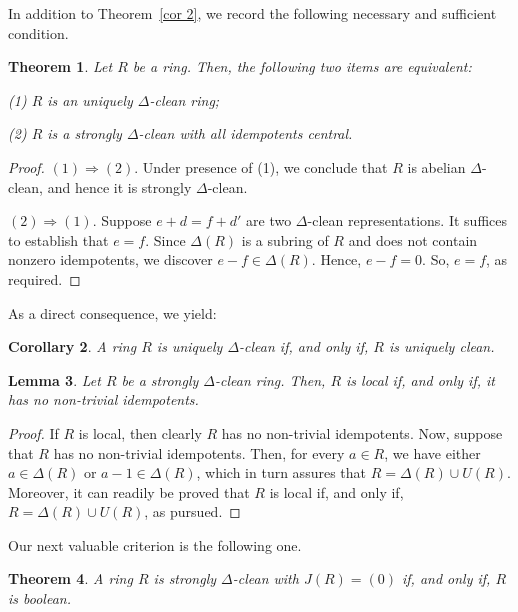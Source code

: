 \documentclass[12pt]{amsart}
\newtheorem{theorem}{Theorem}[section]
\newtheorem{lemma}[theorem]{Lemma}
\newtheorem{corollary}[theorem]{Corollary}
\theoremstyle{definition}
\begin{document}
In addition to Theorem~\ref{cor 2}, we record the following necessary and sufficient condition.

\begin{theorem}\label{cor 3}
Let $R$ be a ring. Then, the following two items are equivalent:
	
(1) $R$ is an uniquely $\Delta$-clean ring;
	
(2) $R$ is a strongly $\Delta$-clean with all idempotents central.
\end{theorem}

\begin{proof}
$(1)\Rightarrow(2)$. Under presence of (1), we conclude that $R$ is abelian $\Delta$-clean, and hence it is strongly $\Delta$-clean.
	
$(2)\Rightarrow (1)$. Suppose $e+d=f+d'$ are two $\Delta$-clean representations. It suffices to establish that $e=f$. Since $\Delta(R)$ is a subring of $R$ and does not contain nonzero idempotents, we discover $e-f\in \Delta(R)$. Hence, $e-f=0$. So, $e=f$, as required.
\end{proof}

As a direct consequence, we yield:

\begin{corollary}
A ring $R$ is uniquely $\Delta$-clean if, and only if, $R$ is uniquely clean.
\end{corollary}

\begin{lemma} \label{ni idempotent}
Let $R$ be a strongly $\Delta$-clean ring. Then, $R$ is local if, and only if, it has no non-trivial idempotents.
\end{lemma}

\begin{proof}
If $R$ is local, then clearly $R$ has no non-trivial idempotents. Now, suppose that $R$ has no non-trivial idempotents. Then, for every $a \in R$, we have either $a \in \Delta(R)$ or $a-1 \in \Delta(R)$, which in turn assures that $R = \Delta(R) \cup U(R)$. Moreover, it can readily be proved that $R$ is local if, and only if, $R = \Delta(R) \cup U(R)$, as pursued.
\end{proof}

Our next valuable criterion is the following one.

\begin{theorem}\label{boolean}
A ring $R$ is strongly $\Delta$-clean with $J(R)=(0)$ if, and only if, $R$ is boolean.
\end{theorem}
\end{document}
